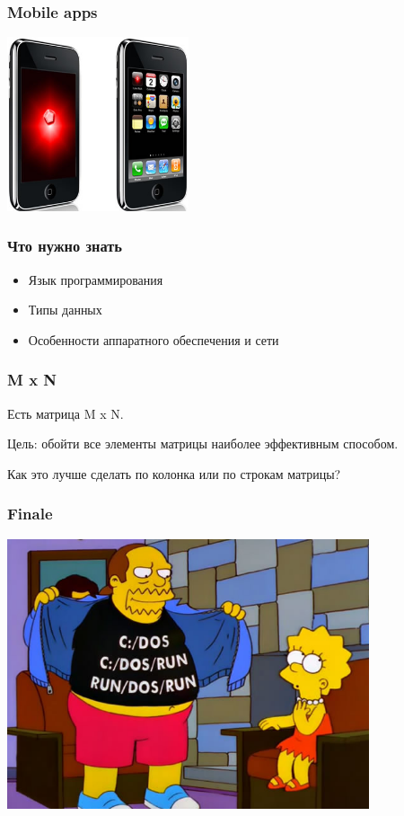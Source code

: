 \documentclass[10pt,pdf,hyperref={unicode}]{beamer}
\begin{document}
\begin{frame}
\frametitle{ Mobile apps }
	\center
	\includegraphics[width=0.4\textwidth]{./imrich.png}
\end{frame}

\begin{frame}
\frametitle{ Что нужно знать}

\begin{itemize}

	\item Язык программирования
	\item Типы данных
	\item  Особенности аппаратного обеспечения и сети

\end{itemize}

\end{frame}

\begin{frame}
\frametitle{ M x N }

\par
Есть матрица M x N. 

\par
Цель: обойти все элементы матрицы наиболее эффективным способом.

\par
Как это лучше сделать по колонка или по строкам матрицы?

\end{frame}

\begin{frame}
\frametitle{ Finale }

\center
	\includegraphics[width=0.8\textwidth]{./run_dos_run.png}

\end{frame}
\end{document}
